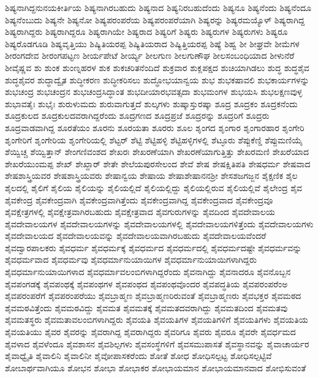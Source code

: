 {ಶಿಷ್ಯನಾಗಿದ್ದನುನಯಕೀರ್ತಿಯ
ಶಿಷ್ಯನಾಗಿರಬಹುದು
ಶಿಷ್ಯನಾದ
ಶಿಷ್ಯನಿರಬಹುದೆಂದು
ಶಿಷ್ಯನೂ
ಶಿಷ್ಯನೆಂದು
ಶಿಷ್ಯನೆಂದೂ
ಶಿಷ್ಯನೆಂಬುದು
ಶಿಷ್ಯನೇ
ಶಿಷ್ಯನೋ
ಶಿಷ್ಯಪರಂಪರೆಯ
ಶಿಷ್ಯಪರಂಪರೆಯಾಗಿ
ಶಿಷ್ಯರನ್ನು
ಶಿಷ್ಯರಮಯ್ಯೊಳ್
ಶಿಷ್ಯರಾಗಿದ್ದ
ಶಿಷ್ಯರಾಗಿದ್ದರು
ಶಿಷ್ಯರಾಗಿದ್ದರೂ
ಶಿಷ್ಯರಾಗಿಯೇ
ಶಿಷ್ಯರಾದ
ಶಿಷ್ಯರಿಗೆ
ಶಿಷ್ಯರು
ಶಿಷ್ಯರುಗಳ
ಶಿಷ್ಯರುಗಳು
ಶಿಷ್ಯರೂ
ಶಿಷ್ಯರೊಡಗೂಡಿ
ಶಿಷ್ಯವೃತ್ತಿಯು
ಶಿಷ್ಯಿತಿಯರಪ್ಪ
ಶಿಷ್ಯಿತಿಯರಾದ
ಶಿಷ್ಯಿತ್ತಿಯರಪ್ಪ
ಶಿಷ್ಯೆ
ಶಿಹ್ವ
ಶೀ
ಶೀಘ್ರವೇ
ಶೀಮೆಗಳ
ಶೀರಂಗದೇವ
ಶೀರಂಗಪಟ್ಟಣ
ಶೀರ್ಯಪೇಟೆ
ಶೀರ್ಯ್ಯ
ಶೀಲಗುಣ
ಶೀಲಗುಣೌಘ
ಶೀಲಸಂಬಂಧಿಯಾದ
ಶೀಳುನೆರೆ
ಶೀವೈಷ್ಣವ
ಶು
ಶುಂಕ
ಶುಂಣ್ನಹರಳ
ಶುಕ
ಶುಕಚರಿತನೆಂದಿದೆ
ಶುಕ್ರವಾರ
ಶುಕ್ಲಪಕ್ಷದ
ಶುಚಿಯಾಗಿಡಲು
ಶುದ್ಧ
ಶುದ್ಧಶೈವ
ಶುದ್ಧಶೈವರ
ಶುದ್ಧಾದ್ವೈತ
ಶುದ್ಧೀಕರಣ
ಶುದ್ಧೀಕರಿಸಲು
ಶುದ್ಧೋಭಯಾನ್ವಯ
ಶುಭ
ಶುಭಕಷಾವಲಿ
ಶುಭಕಾರ್ಯಗಳನ್ನು
ಶುಭಚಂದ್ರ
ಶುಭಚಂದ್ರನ
ಶುಭಚಂದ್ರಸಿದ್ಧಾಂತ
ಶುಭದೀಯಾರಭವತ್ಸದಾ
ಶುಭಮಂಗಳ
ಶುಭಯಸಿ
ಶುಭಲಕ್ಷಣವುಳ್ಳ
ಶುಭಾವತೈಃ
ಶುಭೈಃ
ಶುರುಳುಮದು
ಶುರುವಾಗುತ್ತದೆ
ಶುಲ್ಕಗಳು
ಶುಷ್ಕಾಸ್ತುರಷ್ಕಾ
ಶೂದ್ರ
ಶೂದ್ರಕಂ
ಶೂದ್ರಕನೆಂದು
ಶೂದ್ರಕುಲದ
ಶೂದ್ರಕುಲದವರಾಗಿದ್ದರೆಂದು
ಶೂದ್ರಗಣದ
ಶೂದ್ರಪ್ರಜೆ
ಶೂದ್ರರನ್ನು
ಶೂದ್ರರಿಗೆ
ಶೂದ್ರರು
ಶೂದ್ರವಾಡವಾಗಿದ್ದ
ಶೂರತೆಯಂ
ಶೂರನು
ಶೂರಯತಾ
ಶೂರರು
ಶೂಲ
ಶೃಂಗದ
ಶೃಂಗಾರ
ಶೃಂಗಾರಹಾರ
ಶೃಂಗೇರಿ
ಶೃಂಗೇರಿಗೆ
ಶೃಂಗೇರಿಯ
ಶೃಂಗೇರಿಯಲ್ಲಿ
ಶೆಟ್ಟರ್
ಶೆಟ್ಟಿ
ಶೆಟ್ಟಿಹಳ್ಳಿ
ಶೆಟ್ಟಿಹಳ್ಳಿಗಳಲ್ಲಿ
ಶೆಟ್ಳೂರು
ಶೆಪ್ಪುಕೆಣ್ಡಿ
ಶೆಪ್ಪುಮಣಿಯೈ
ಶೆಯ್ವಿಚ್ಚ
ಶೆಯ್ವಿತ್ತಾನ್
ಶೇಂಗಣಿವಂಶದ
ಶೇಖರಃ
ಶೇಖರಣೆಯಾಗಿ
ಶೇಖರಣೆಯಾಗುತ್ತಿತ್ತು
ಶೇಖರಮಣಿ
ಶೇಖರೆಯಾದ
ಶೇಖರೆಯುಂಮಪ್ಪ
ಶೇಖ್
ಶೇಖ್ದಾರ್
ಶೇತೇ
ಶೇಲೆಯಪುರಸೇಲಂದ
ಶೇವೆ
ಶೇಷ
ಶೇಷಕ್ಷಿತಿಪತಿ
ಶೇಷಧರ್ಮ
ಶೇಷವಾದ
ಶೇಷಶಾಸ್ತ್ರಿಯವರ
ಶೇಷಶಾಸ್ತ್ರಿಯವರು
ಶೇಷಾನ್ವಯ
ಶೇಷಾಯ
ಶೇಷಾಶೇಷಾನನಶ್ರೀ
ಶೇಸಶಜಗಜ್ಜನ
ಶೈಕ್ಷಣಿಕ
ಶೈಲ
ಶೈಲದಲ್ಲಿ
ಶೈಲಿಗೆ
ಶೈಲಿಯ
ಶೈಲಿಯನ್ನು
ಶೈಲಿಯಲ್ಲಿದೆ
ಶೈಲಿಯಲ್ಲಿದ್ದು
ಶೈಲಿಯಲ್ಲಿರುವ
ಶೈಲಿಯಲ್ಲಿವೆ
ಶೈಲೇಂದ್ರ
ಶೈವ
ಶೈವಕೇಂದ್ರ
ಶೈವಕೇಂದ್ರವಾಗಿ
ಶೈವಕೇಂದ್ರವಾಗಿತ್ತೆಂದು
ಶೈವಕೇಂದ್ರವಾಗಿದ್ದ
ಶೈವಕೇಂದ್ರವಾದ
ಶೈವಕೇಂದ್ರವೂ
ಶೈವಕ್ಷೇತ್ರಗಳಲ್ಲಿ
ಶೈವಕ್ಷೇತ್ರವಾಗಿರಬಹುದು
ಶೈವಕ್ಷೇತ್ರವಾದ
ಶೈವಗುರುಗಳನ್ನು
ಶೈವದಿಂದ
ಶೈವದೇವಾಲಯ
ಶೈವದೇವಾಲಯಗಳ
ಶೈವದೇವಾಲಯಗಳನ್ನು
ಶೈವದೇವಾಲಯಗಳಲ್ಲಿ
ಶೈವದೇವಾಲಯಗಳಿತ್ತೆಂದು
ಶೈವದೇವಾಲಯಗಳು
ಶೈವದೇವಾಲಯದ
ಶೈವದೇವಾಲಯವನ್ನು
ಶೈವದೇವಾಲಯವಾಗಿರಬಹುದು
ಶೈವದೇವಾಲಯವೆಂದರೆ
ಶೈವದ್ವಾರಪಾಲಕರು
ಶೈವಧರ್ಮ
ಶೈವಧರ್ಮಕ್ಕೆ
ಶೈವಧರ್ಮದ
ಶೈವಧರ್ಮದಲ್ಲಿ
ಶೈವಧರ್ಮದಷ್ಟೇ
ಶೈವಧರ್ಮವನ್ನು
ಶೈವಧರ್ಮವಾದ
ಶೈವಧರ್ಮವು
ಶೈವಧರ್ಮಾನುಯಾಯಿಗಳ
ಶೈವಧರ್ಮಾನುಯಾಯಿಗಳಾಗಿದ್ದರು
ಶೈವಧರ್ಮಾನುಯಾಯಿಗಳಾದ
ಶೈವಧರ್ಮಾವಲಂಬಿಗಳಾಗಿದ್ದರೆಂದು
ಶೈವನಾಗಿದ್ದು
ಶೈವನಾದರೂ
ಶೈವನೊಬ್ಬನ
ಶೈವಪಂಗಡಕ್ಕೆ
ಶೈವಪಂಥಕ್ಕೆ
ಶೈವಪಂಥಗಳ
ಶೈವಪಂಥದ
ಶೈವಪಂಥವೊಂದರ
ಶೈವಪದ್ಧತಿಯ
ಶೈವಪರಂಪರೆಂಅ
ಶೈವಪರಂಪರೆಗೆ
ಶೈವಪರಂಪರೆಯು
ಶೈವಬ್ರಾಹ್ಮಣ
ಶೈವಬ್ರಾಹ್ಮಣರಿರುವಂತೆ
ಶೈವಬ್ರಾಹ್ಮಣರು
ಶೈವಭಕ್ತರ
ಶೈವಮಠದ
ಶೈವಮಠವಿತ್ತೆಂದು
ಶೈವಮಠವಿದ್ದು
ಶೈವಮತ
ಶೈವಮತಕ್ಕೆ
ಶೈವಮತದವರಾಗಿದ್ದು
ಶೈವಮತದಿಂದ
ಶೈವಮತವು
ಶೈವಮತಸ್ಥರು
ಶೈವಮತಾವಲಂಬಿಗಳಾಗಿದ್ದರು
ಶೈವಯತಿ
ಶೈವಯತಿಗಳ
ಶೈವಯತಿಗಳಿಗೆ
ಶೈವಯತಿಗಳು
ಶೈವಯತಿಯ
ಶೈವಯತಿಯು
ಶೈವರ
ಶೈವರನ್ನು
ಶೈವರಾಗಿದ್ದ
ಶೈವರಾಗಿದ್ದರು
ಶೈವರಿಗೂ
ಶೈವರು
ಶೈವರೂ
ಶೈವರೇ
ಶೈವರ್ಧಮದ
ಶೈವಳಾದ
ಶೈವಳೆಂದೂ
ಶೈವಶಾಸನ
ಶೈವಶಿಲ್ಪಗಳು
ಶೈವಸಂಸ್ಥೆಗಳಿಗೆ
ಶೈವಸಮುಪಾಸತೆ
ಶೈವಸ್ಥಾನವನ್ನು
ಶೈವಾಚಾರ್ಯರ
ಶೈವಾಧ್ವೈತಿ
ಶೈವಾಲಿನಿ
ಶೈವಾಲಿನೀ
ಶೈವೋಪಾಸಕರೆಂದು
ಶೋತೆ
ಶೋಧ
ಶೋಧಿಸಲ್ಪಟ್ಟ
ಶೋಧಿಸಲ್ಪಟ್ಟಿವೆ
ಶೋಬಾರ್ಥವಾಗಿಯೂ
ಶೋಭನ
ಶೋಭಾ
ಶೋಭಾಕರ
ಶೋಭಾಯಮಾನ
ಶೋಭಾಯಮಾನವಾದ
ಶೋಭಿಸುವಂತೆ
}
